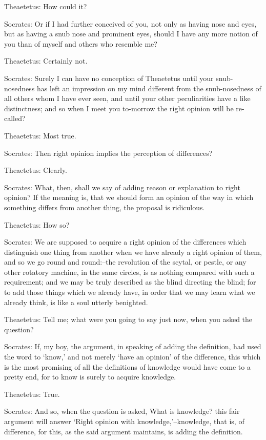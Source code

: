 Theaetetus: How could it?

Socrates: Or if I had further conceived of you, not only as having nose
and eyes, but as having a snub nose and prominent eyes, should I have
any more notion of you than of myself and others who resemble me?

Theaetetus: Certainly not.

Socrates: Surely I can have no conception of Theaetetus until your
snub-nosedness has left an impression on my mind different from the
snub-nosedness of all others whom I have ever seen, and until your other
peculiarities have a like distinctness; and so when I meet you to-morrow
the right opinion will be re-called?

Theaetetus: Most true.

Socrates: Then right opinion implies the perception of differences?

Theaetetus: Clearly.

Socrates: What, then, shall we say of adding reason or explanation to
right opinion? If the meaning is, that we should form an opinion of
the way in which something differs from another thing, the proposal is
ridiculous.

Theaetetus: How so?

Socrates: We are supposed to acquire a right opinion of the differences
which distinguish one thing from another when we have already a right
opinion of them, and so we go round and round:--the revolution of the
scytal, or pestle, or any other rotatory machine, in the same circles,
is as nothing compared with such a requirement; and we may be truly
described as the blind directing the blind; for to add those things
which we already have, in order that we may learn what we already think,
is like a soul utterly benighted.

Theaetetus: Tell me; what were you going to say just now, when you asked
the question?

Socrates: If, my boy, the argument, in speaking of adding the
definition, had used the word to `know,' and not merely `have an
opinion' of the difference, this which is the most promising of all the
definitions of knowledge would have come to a pretty end, for to know is
surely to acquire knowledge.

Theaetetus: True.

Socrates: And so, when the question is asked, What is knowledge? this
fair argument will answer `Right opinion with knowledge,'--knowledge,
that is, of difference, for this, as the said argument maintains, is
adding the definition.

